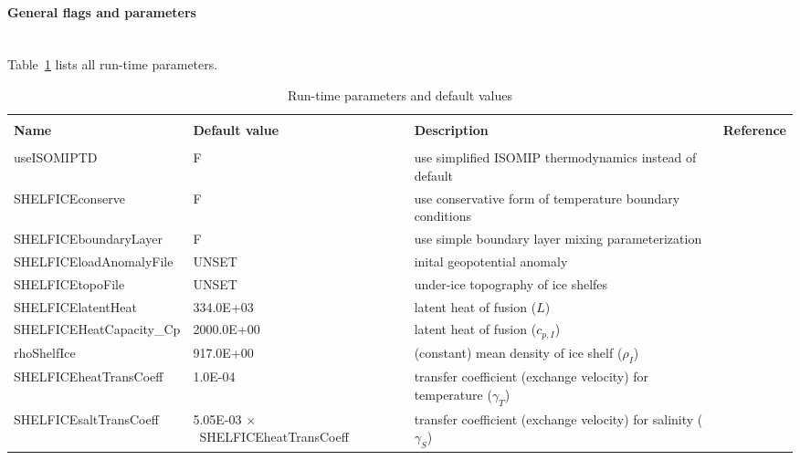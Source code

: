 \paragraph{General flags and parameters}
~ \\
%
Table~\ref{tab:pkg:shelfice:runtimeparms} lists all run-time parameters.
\begin{table}[h!]
  \caption{Run-time parameters and default values
    \label{tab:pkg:shelfice:runtimeparms}}
  {\footnotesize
    \begin{tabular}{|lp{4cm}p{4cm}c|}
      \hline
      & & & \\
      \textbf{Name}  &  \textbf{Default value}  
      &  \textbf{Description}   &  \textbf{Reference}  \\
      & & & \\
      \hline \hline
      useISOMIPTD              & F
      &   use simplified ISOMIP thermodynamics instead of default
      &  %
      \\
      SHELFICEconserve         & F
      &   use conservative form of temperature boundary conditions
      &  %
      \\
      SHELFICEboundaryLayer    & F
      &   use simple boundary layer mixing parameterization
      &  %
      \\
      SHELFICEloadAnomalyFile  & UNSET
      &   inital geopotential anomaly
      &  %
      \\
      SHELFICEtopoFile         & UNSET
      &   under-ice topography of ice shelfes
      &  %
      \\
      SHELFICElatentHeat       &  334.0E+03
      &   latent heat of fusion ($L$)
      &  %
      \\
      SHELFICEHeatCapacity\_Cp & 2000.0E+00
      &   latent heat of fusion ($c_{p,I}$)
      &  %
      \\
      rhoShelfIce              &  917.0E+00
      &   (constant) mean density of ice shelf ($\rho_{I}$)
      &  %
      \\
      SHELFICEheatTransCoeff   &    1.0E-04
      &   transfer coefficient (exchange velocity) for temperature
      ($\gamma_T$)
      &  %
      \\
      SHELFICEsaltTransCoeff   &   5.05E-03 $\times$~SHELFICEheatTransCoeff
      &   transfer coefficient (exchange velocity) for salinity
      ($\gamma_S$)
      &  %
      \\

\end{tabular}}
\end{table}
